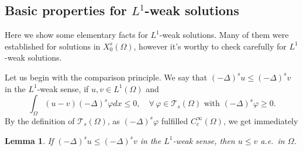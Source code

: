 \documentclass[10pt]{article}
\numberwithin{equation}{section}
\newtheorem{lemma}[theorem]{Lemma}
\numberwithin{equation}{section}
\begin{document}

\subsection{Basic properties for $L^1$-weak solutions}
Here we show some elementary facts for $L^1$-weak solutions. Many of them were established for solutions in $X_0^s(\Omega)$, however it's worthy to check carefully for $L^1$-weak solutions. 

Let us begin with the comparison principle. We say that
 $(-\Delta)^su \le (-\Delta)^sv$ in the $L^1$-weak sense, if $u, v\in L^1(\Omega)$ and
 \begin{equation}\label{2306011618}
 \int_{\Omega}(u-v)(-\Delta)^s\varphi dx\le 0,\quad \forall\,\varphi\in \mathcal{T}_s(\Omega) \mbox{ with } (-\Delta)^s\varphi\ge 0.
 \end{equation}
By the definition of $\mathcal{T}_s(\Omega)$, as $(-\Delta)^s\varphi$ fulfilled $C_c^\infty(\Omega)$, we get immediately
\begin{lemma}\label{2306081933}
If $(-\Delta)^su \le (-\Delta)^sv$ in the $L^1$-weak sense, then $u\le v$ a.e.~in $\Omega$.
\end{lemma}
\end{document}
